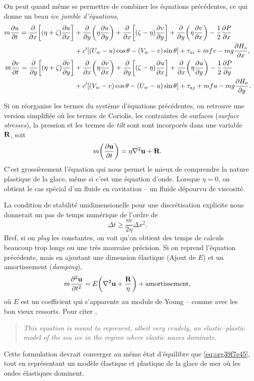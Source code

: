 \documentclass[10pt]{article}
\numberwithin{equation}{section}
\newcommand{\uu}{\vb{u}}
\begin{document}
On peut quand même se permettre de combiner les équations précédentes, ce qui donne un beau \emph{ice jumble d'équations},
\begin{align}
   m \pdv{u}{t} = \pdv{}{x}\qty[(\eta + \zeta)\pdv{u}{x}] &+\pdv{}{y}\qty(\eta\pdv{u}{y}) + \pdv{}{x}\qty[(\zeta-\eta)\pdv{v}{y}] + \pdv{}{y}\qty(\eta \pdv{v}{x}) - \frac{1}{2}\pdv{P}{x}\nonumber\\
     & + c'\qty[\qty(U_w-u)\cos\theta - \qty(V_w-v)\sin\theta] + \tau_{ai} + mfv - mg\pdv{H_o}{x},\\
   m \pdv{v}{t} = \pdv{}{y}\qty[(\eta + \zeta)\pdv{v}{y}] &+\pdv{}{x}\qty(\eta\pdv{v}{x}) + \pdv{}{y}\qty[(\zeta-\eta)\pdv{u}{x}] + \pdv{}{x}\qty(\eta \pdv{u}{y}) - \frac{1}{2}\pdv{P}{y}\nonumber\\
     & + c'\qty[\qty(V_w-v)\cos\theta - \qty(U_w-u)\sin\theta] + \tau_{aj} + mfu - mg\pdv{H_o}{y}.
\end{align}

Si on réorganise les termes du système d'équations précédentes, on retrouve une version simplifiée où les termes de Coriolis, les contraintes de surfaces (\emph{surface stresses}), la pression et les termes de \emph{tilt} sont sont incorporés dans une variable \(\vb{R}\), soit
\begin{equation}
\label{eq:org39f7e45}
   m\qty(\pdv{\uu}{t}) = \eta \laplacian{\uu} + \vb{R}.
\end{equation}
C'est grossièrement l'équation qui nous permet le mieux de comprendre la nature plastique de la glace, même si c'est une équation d'onde. 
Lorsque \(\eta=0\), on obtient le cas spécial d'un fluide en cavitation -- un fluide dépourvu de viscosité.\bigskip

La condition de stabilité unidimensionelle pour une discrétisation explicite nous donnerait un pas de temps numérique de l'ordre de
\begin{equation}
   \Delta t \geq \frac{m}{2\eta} \Delta x^2.
\end{equation}
Bref, si on \emph{plug} les constantes, on voit qu'on obtient des temps de calculs beaucoup trop longs ou une très mauvaise précision.
Si on reprend l'équation précédente, mais en ajoutant une dimension élastique (Ajout de \(E\)) et un amortissement (\emph{damping}),
\begin{equation}
\label{eq:org87fe396}
   m \pdv[2]{\uu}{t} =E \qty(\laplacian{\uu} + \frac{\vb{R}}{\eta}) + \text{amortissement},
\end{equation}
où \(E\) est un coefficient qui s'apparente au module de Young -- comme avec les bon vieux ressorts. 
Pour citer \Textcite{hunke1997elastic},
\begin{quote}
\emph{This equation is meant to represent, albeit very crudely, an elastic–plastic model of the sea ice in the regime where elastic waves dominate.}
\end{quote}
Cette formulation devrait converger au même état d'équilibre que \ref{eq:org39f7e45}, tout en représentant un modèle élastique et plastique de la glace de mer où les ondes élastiques dominent.\bigskip
\end{document}
